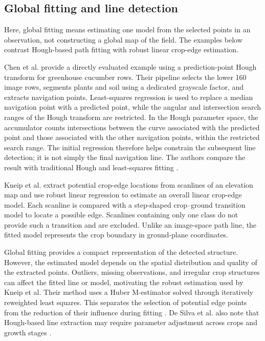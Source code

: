 \subsection{Global fitting and line detection}
\label{subsec:fitting_globale}
\label{subsec:hough_fitting}

Here, global fitting means estimating one model from the selected points
in an observation, not constructing a global map of the field. The
examples below contrast Hough-based path fitting with robust linear
crop-edge estimation.

Chen et al. provide a directly evaluated example using a prediction-point
Hough transform for greenhouse cucumber rows. Their pipeline selects the
lower 160 image rows, segments plants and soil using a dedicated grayscale
factor, and extracts navigation points. Least-squares regression is used
to replace a median navigation point with a predicted point, while the
angular and intersection search ranges of the Hough transform are restricted.
In the Hough parameter space, the accumulator counts intersections
between the curve associated with the predicted point and those
associated with the other navigation points, within the restricted
search range. The initial regression therefore helps constrain the
subsequent line detection; it is not simply the final navigation line.
The authors compare the result with traditional Hough and least-squares
fitting \cite[Sections~2--3]{chen2021navigation}.

Kneip et al. extract potential crop-edge locations from scanlines of an
elevation map and use robust linear regression to estimate an overall
linear crop-edge model. Each scanline is compared with a step-shaped
crop--ground transition model to locate a possible edge. Scanlines
containing only one class do not provide such a transition and are
excluded. Unlike an image-space path line, the fitted model represents
the crop boundary in ground-plane coordinates.

Global fitting provides a compact representation of the detected
structure. However, the estimated model depends on the spatial
distribution and quality of the extracted points. Outliers, missing
observations, and irregular crop structures can affect the fitted line or
model, motivating the robust estimation used by Kneip et al. Their
method uses a Huber M-estimator solved through iteratively reweighted
least squares. This separates the selection of potential edge points
from the reduction of their influence during fitting
\cite[Sections~6--7]{kneip2020cropedge}. De Silva et al. also note that Hough-based
line extraction may require parameter adjustment across crops and growth
stages \cite[Section~2.2]{silva2023rowdetection}.

